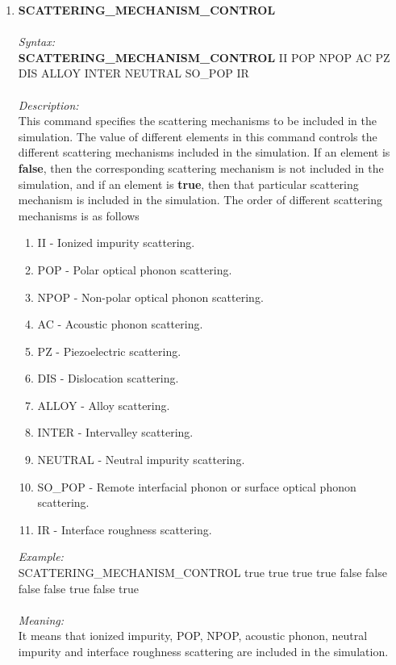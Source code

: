 \documentclass[12pt]{article}
\begin{document}
\begin{enumerate}
    \item \textbf{SCATTERING\_MECHANISM\_CONTROL}  \\ \\
    \textit{Syntax:} \\
    \textbf{SCATTERING\_MECHANISM\_CONTROL} II POP NPOP AC PZ DIS ALLOY INTER NEUTRAL SO\_POP IR \\ \\
    \textit{Description:} \\
    This command specifies the scattering mechanisms to be included in the simulation. The value of different elements in this command controls the different scattering mechanisms included in the simulation. If an element is \textbf{false}, then the corresponding scattering mechanism is not included in the simulation, and if an element is \textbf{true}, then that particular scattering mechanism is included in the simulation. The order of different scattering mechanisms is as follows 
    \begin{enumerate}
        \item II - Ionized impurity scattering.
        \item POP - Polar optical phonon scattering.
        \item NPOP - Non-polar optical phonon scattering.
        \item AC - Acoustic phonon scattering.
        \item PZ - Piezoelectric scattering.
        \item DIS - Dislocation scattering.
        \item ALLOY - Alloy scattering.
        \item INTER - Intervalley scattering.
        \item NEUTRAL - Neutral impurity scattering. 
        \item SO\_POP - Remote interfacial phonon or surface optical phonon scattering.
        \item IR - Interface roughness scattering.
    \end{enumerate}

    \textit{Example:} \\
    SCATTERING\_MECHANISM\_CONTROL true true true true false false false false true false true \\ \\
    \textit{Meaning:} \\    
    It means that ionized impurity, POP, NPOP, acoustic phonon, neutral impurity and interface roughness scattering are included in the simulation. \\ \\
    

\end{enumerate}
\end{document}
